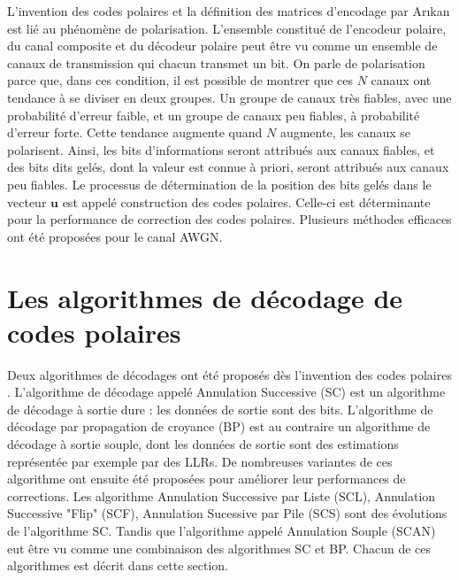 L'invention des codes polaires et la définition des matrices d'encodage par Ar{\i}kan \cite{arikan_channel_2009} est lié au phénomène de polarisation. L'ensemble constitué de l'encodeur polaire, du canal composite et du décodeur polaire peut être vu comme un ensemble de canaux de transmission qui chacun transmet un bit. On parle de polarisation parce que, dans ces condition, il est possible de montrer que ces $N$ canaux ont tendance à se diviser en deux groupes. Un groupe de canaux très fiables, avec une probabilité d'erreur faible, et un groupe de canaux peu fiables, à probabilité d'erreur forte. Cette tendance augmente quand $N$ augmente, les canaux se polarisent. Ainsi, les bits d'informations seront attribués aux canaux fiables, et des bits dits gelés, dont la valeur est connue à priori, seront attribués aux canaux peu fiables. Le processus de détermination de la position des bits gelés dans le vecteur $\mathbold{u}$ est appelé construction des codes polaires. Celle-ci est déterminante pour la performance de correction des codes polaires. Plusieurs méthodes efficaces ont été proposées \cite{tal_how_2013,trifonov_efficient_2012} pour le canal AWGN.

\section{Les algorithmes de décodage de codes polaires}

Deux algorithmes de décodages ont été proposés dès l'invention des codes polaires \cite{arikan_channel_2009}. L'algorithme de décodage appelé Annulation Successive (SC) est un algorithme de décodage à sortie dure : les données de sortie sont des bits. L'algorithme de décodage par propagation de croyance (BP) est au contraire un algorithme de décodage à sortie souple, dont les données de sortie sont des estimations représentée par exemple par des LLRs. De nombreuses variantes de ces algorithme ont ensuite été proposées pour améliorer leur performances de corrections. Les algorithme Annulation Successive par Liste (SCL), Annulation Successive "Flip" (SCF), Annulation Sucessive par Pile (SCS) sont des évolutions de l'algorithme SC. Tandis que l'algorithme appelé Annulation Souple (SCAN) eut être vu comme une combinaison des algorithmes SC et BP. Chacun de ces algorithmes est décrit dans cette section.


